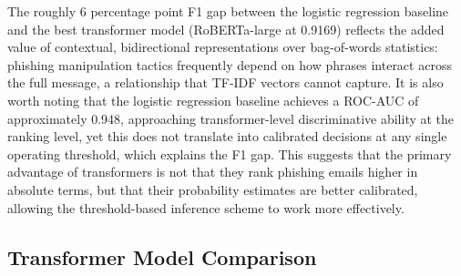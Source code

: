 \begin{table}[htbp]
\centering
\caption[Phishing detection results on the held-out test set]{Phishing detection results on the held-out test set. All metrics are computed for the positive (phishing) class.}
\label{tab:results_spam_full}
\end{table}

The roughly 6 percentage point F1 gap between the logistic regression baseline and the best transformer model (\acs{RoBERTa}-large at 0.9169) reflects the added value of contextual, bidirectional representations over bag-of-words statistics: phishing manipulation tactics frequently depend on how phrases interact across the full message, a relationship that TF-IDF vectors cannot capture. It is also worth noting that the logistic regression baseline achieves a ROC-AUC of approximately 0.948, approaching transformer-level discriminative ability at the ranking level, yet this does not translate into calibrated decisions at any single operating threshold, which explains the F1 gap. This suggests that the primary advantage of transformers is not that they rank phishing emails higher in absolute terms, but that their probability estimates are better calibrated, allowing the threshold-based inference scheme to work more effectively.

\subsection{Transformer Model Comparison}

